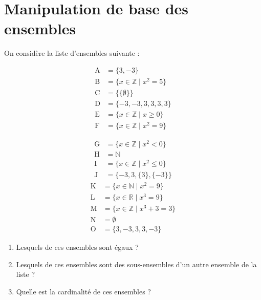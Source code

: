 \documentclass[a4paper,11pt]{article}
\begin{document}
\section{Manipulation de base des ensembles}

On considère la liste d'ensembles suivante :

\begin{minipage}[t]{0.45\textwidth}
\begin{align*}
\text{A} &= \{3, -3\} \\
\text{B} &= \{x \in \mathbb{Z} \mid x^2 = 5\} \\
\text{C} &= \{\{\emptyset\}\} \\
\text{D} &= \{-3, -3, 3, 3, 3, 3\} \\
\text{E} &= \{x \in \mathbb{Z} \mid x \geq 0\} \\
\text{F} &= \{x \in \mathbb{Z} \mid x^2 = 9\}
\end{align*}
\end{minipage}
\hfill
\begin{minipage}[t]{0.45\textwidth}
\begin{align*}
\text{G} &= \{x \in \mathbb{Z} \mid x^2 < 0\} \\
\text{H} &= \mathbb{N} \\
\text{I} &= \{x \in \mathbb{Z} \mid x^2 \leq 0\} \\
\text{J} &= \{-3, 3, \{3\}, \{-3\}\}
\end{align*}
\vspace{0.5cm}
\begin{align*}
\text{K} &= \{x \in \mathbb{N} \mid x^2 = 9\} \\
\text{L} &= \{x \in \mathbb{R} \mid x^3 = 9\} \\
\text{M} &= \{x \in \mathbb{Z} \mid x^3 + 3 = 3\} \\
\text{N} &= \emptyset \\
\text{O} &= \{3, -3, 3, 3, -3\}
\end{align*}
\end{minipage}

\begin{enumerate}
\item Lesquels de ces ensembles sont égaux ?

\item Lesquels de ces ensembles sont des sous-ensembles d'un autre ensemble de la liste ?

\item Quelle est la cardinalité de ces ensembles ?
\end{enumerate}
\end{document}
